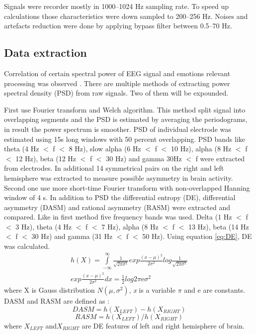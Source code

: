 \documentclass[10pt,journal,compsoc,twoside]{IEEEtran}
\newcommand{\Ref}[2]{#2 \ref{#1}}
\newcommand{\fromto}[5]{(#1 #3 $<$ #4 $<$ #2 #3)}
\newcommand{\me}{\mathrm{e}}
\begin{document}
Signals were recorder mostly in \numrange[range-phrase = --]{1000}{1024} Hz sampling rate. To speed up calculations those characteristics were down sampled to \numrange[range-phrase = --]{200}{256} Hz. Noises and artefacts reduction were done by applying bypass filter between  \numrange{0.5}{70} Hz.
\subsection{Data extraction}
Correlation of certain spectral power of EEG signal and emotions relevant processing was observed \cite{AftanasSavotinaMakhnev2005}. There are multiple methods of extracting power spectral density (PSD) from raw signals. Two of them will be expounded.

First \cite{WeiLongBoNanBaoLiang2014} use Fourier transform and Welch algorithm. This method split signal into overlapping segments and the PSD is estimated by averaging the periodograms, in result the power spectrum is smoother. PSD of individual electrode was estimated using 15s long windows with 50 percent overlapping. PSD bands like theta \fromto{4}{8}{Hz}{f} \  ,  slow alpha \fromto{6}{10}{Hz}{f} \  ,  alpha \fromto{8}{12}{Hz}{f} \  ,  beta \fromto{12}{30}{Hz}{f} \\  and  gamma 30Hz $<$ f were extracted from electrodes. In additional 14 symmetrical pairs on the right and left hemisphere was extracted to measure possible asymmetry in brain activity.
\newline
\newline
Second one use more short-time Fourier transform with non-overlapped Hanning window of 4 s. In addition to PSD the differential entropy (DE), differential asymmetry (DASM) and rational asymmetry (RASM) were extracted and compared. Like in first method five frequency bands was used. Delta \fromto{1}{3}{Hz}{f} \  ,  theta \fromto{4}{7}{Hz}{f} \  ,  alpha \fromto{8}{13}{Hz}{f} \  ,  beta \fromto{14}{30}{Hz}{f} \\ and  gamma \fromto{31}{50}{Hz}{f} \,. Using \Ref{eq:DE}{equation}, DE was calculated.
\begin{equation}
\begin{aligned}
h(X)=\int\limits_{-\infty}^{\infty} \frac{1}{\sqrt{2\pi\sigma^{2}}}exp \frac{(x - \mu)^{2}}{2\sigma^{2}}log\frac{1}{\sqrt{2\pi\sigma^{2}}}\\ exp\frac{(x - \mu)^{2}}{2\sigma^{2}}dx = \frac{1}{2}log2\pi \me \sigma^{2}
\end{aligned}
\label{eq:DE}
\end{equation}
where X is Gauss distribution $N(\mu, \sigma^2)$, \textit{x} is a variable $\pi$ and $\me$ are constants. DASM and RASM are defined as :
\begin{equation}
DASM = h(X_{LEFT}) - h(X_{RIGHT})
\end{equation}
\begin{equation}
RASM = h(X_{LEFT}) / h(X_{RIGHT})
\end{equation}
where $X_{LEFT}$ and$X_{RIGHT}$ are DE features of left and right hemisphere of brain.
\newpage
\end{document}

